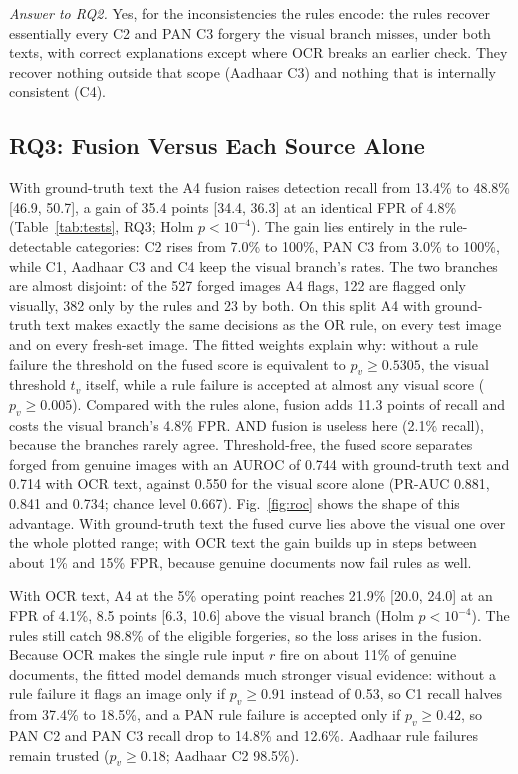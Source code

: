 \documentclass[conference]{IEEEtran}
\begin{document}
\emph{Answer to RQ2.} Yes, for the inconsistencies the rules encode: the
rules recover essentially every C2 and PAN C3 forgery the visual branch
misses, under both texts, with correct explanations except where OCR
breaks an earlier check. They recover nothing outside that scope
(Aadhaar C3) and nothing that is internally consistent (C4).

\subsection{RQ3: Fusion Versus Each Source Alone}
\label{subsec:res-rq3}

With ground-truth text the A4 fusion raises detection recall from
13.4\% to 48.8\% [46.9, 50.7], a gain of 35.4 points [34.4, 36.3] at an
identical FPR of 4.8\% (Table~\ref{tab:tests}, RQ3; Holm $p<10^{-4}$).
The gain lies entirely in the rule-detectable categories: C2 rises from
7.0\% to 100\%, PAN C3 from 3.0\% to 100\%, while C1, Aadhaar C3 and C4
keep the visual branch's rates. The two branches are almost disjoint:
of the 527 forged images A4 flags, 122 are flagged only visually, 382
only by the rules and 23 by both. On this split A4 with ground-truth
text makes exactly the same decisions as the OR rule, on every test
image and on every fresh-set image. The fitted weights explain why:
without a rule failure the threshold on the fused score is equivalent
to $p_v\ge0.5305$, the visual threshold $t_v$ itself, while a rule
failure is accepted at almost any visual score ($p_v\ge0.005$). Compared with the rules alone, fusion
adds 11.3 points of recall and costs the visual branch's 4.8\% FPR. AND
fusion is useless here (2.1\% recall), because the branches rarely
agree. Threshold-free, the fused score separates forged from genuine
images with an AUROC of 0.744 with ground-truth text and 0.714 with OCR
text, against 0.550 for the visual score alone (PR-AUC 0.881, 0.841 and
0.734; chance level 0.667). Fig.~\ref{fig:roc} shows the shape of
this advantage. With ground-truth text the fused curve lies above the
visual one over the whole plotted range; with OCR text the gain builds
up in steps between about 1\% and 15\% FPR, because genuine documents
now fail rules as well.



With OCR text, A4 at the 5\% operating point reaches 21.9\% [20.0, 24.0]
at an FPR of 4.1\%, 8.5 points [6.3, 10.6] above the visual branch
(Holm $p<10^{-4}$). The rules still catch 98.8\% of the eligible
forgeries, so the loss arises in the fusion. Because OCR makes the
single rule input $r$ fire on about 11\% of genuine documents, the fitted
model demands much stronger visual evidence: without a rule failure it
flags an image only if $p_v\ge0.91$ instead of 0.53, so C1 recall halves
from 37.4\% to 18.5\%, and a PAN rule failure is accepted only if
$p_v\ge0.42$, so PAN C2 and PAN C3 recall drop to 14.8\% and 12.6\%.
Aadhaar rule failures remain trusted ($p_v\ge0.18$; Aadhaar C2 98.5\%).
\end{document}
